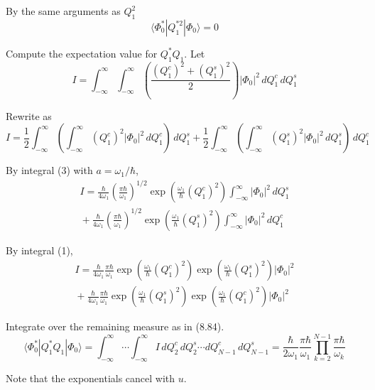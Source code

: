 By the same arguments as $Q_1^2$
\begin{equation*}
\langle\Phi_0^*|Q_1^{*2}|\Phi_0\rangle=0
\end{equation*}

Compute the expectation value for $Q_1^*Q_1$.
Let
\begin{equation*}
I=\int_{-\infty}^\infty\int_{-\infty}^\infty
\left(\frac{(Q_1^c)^2+(Q_1^s)^2}{2}\right)
\vert\Phi_0\vert^2\,dQ_1^c\,dQ_1^s
\end{equation*}

Rewrite as
\begin{equation*}
I=\frac{1}{2}\int_{-\infty}^\infty\left(\int_{-\infty}^\infty (Q_1^c)^2
\vert\Phi_0\vert^2\,dQ_1^c\right)\,dQ_1^s
+\frac{1}{2}\int_{-\infty}^\infty\left(\int_{-\infty}^\infty (Q_1^s)^2
\vert\Phi_0\vert^2\,dQ_1^s\right)\,dQ_1^c
\end{equation*}

By integral (3) with $a=\omega_1/\hbar$,
\begin{multline*}
I=
\frac{\hbar}{4\omega_1}
\left(\frac{\pi\hbar}{\omega_1}\right)^{1/2}
\exp\left(\frac{\omega_1}{\hbar}(Q_1^c)^2\right)
\int_{-\infty}^\infty
\vert\Phi_0\vert^2\,dQ_1^s
\\
{}+\frac{\hbar}{4\omega_1}
\left(\frac{\pi\hbar}{\omega_1}\right)^{1/2}
\exp\left(\frac{\omega_1}{\hbar}(Q_1^s)^2\right)
\int_{-\infty}^\infty
\vert\Phi_0\vert^2\,dQ_1^c
\end{multline*}

By integral (1),
\begin{multline*}
I=
\frac{\hbar}{4\omega_1}
\frac{\pi\hbar}{\omega_1}
\exp\left(\frac{\omega_1}{\hbar}(Q_1^c)^2\right)
\exp\left(\frac{\omega_1}{\hbar}(Q_1^s)^2\right)
\vert\Phi_0\vert^2
\\
{}+
\frac{\hbar}{4\omega_1}
\frac{\pi\hbar}{\omega_1}
\exp\left(\frac{\omega_1}{\hbar}(Q_1^s)^2\right)
\exp\left(\frac{\omega_1}{\hbar}(Q_1^c)^2\right)
\vert\Phi_0\vert^2
\end{multline*}

Integrate over the remaining measure as in (8.84).
\begin{equation*}
\langle\Phi_0^*|Q_1^*Q_1|\Phi_0\rangle
=\int_{-\infty}^\infty\cdots\int_{-\infty}^\infty I\,dQ_2^c\,dQ_2^s\cdots dQ_{N-1}^c\,dQ_{N-1}^s
=\frac{\hbar}{2\omega_1}
\frac{\pi\hbar}{\omega_1}
\prod_{k=2}^{N-1}\frac{\pi\hbar}{\omega_k}
\tag{7}
\end{equation*}

Note that the exponentials cancel with $u$.

